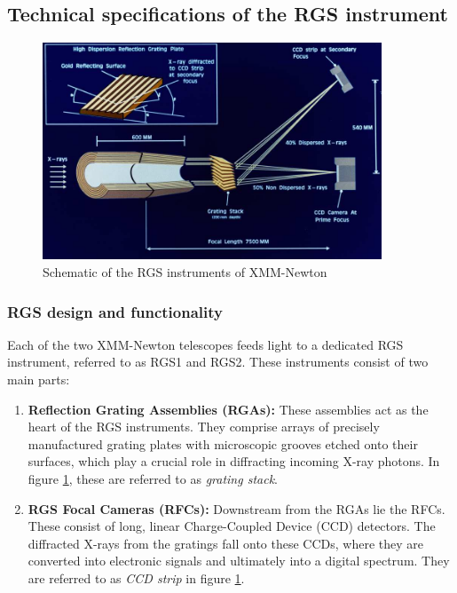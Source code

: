 		\subsection{Technical specifications of the RGS instrument}		
			\begin{figure}[h!]
				\centering
				\includegraphics[width=0.9\textwidth]{xmm-rgs.png}
				\caption{Schematic of the RGS instruments of XMM-Newton}
				\label{xmm-rgs-instrument}
			\end{figure}
			
			\subsubsection{RGS design and functionality}			
				Each of the two XMM-Newton telescopes feeds light to a dedicated RGS instrument, referred to as RGS1 and RGS2. These instruments consist of two main parts:
				\begin{enumerate}
					\item \textbf{Reflection Grating Assemblies (RGAs):} These assemblies act as the heart of the RGS instruments. They comprise arrays of precisely manufactured grating plates with microscopic grooves etched onto their surfaces, which play a crucial role in diffracting incoming X-ray photons. In figure \ref{xmm-rgs-instrument}, these are referred to as \emph{grating stack}.
					
					\item \textbf{RGS Focal Cameras (RFCs):} Downstream from the RGAs lie the RFCs. These consist of long, linear Charge-Coupled Device (CCD) detectors. The diffracted X-rays from the gratings fall onto these CCDs, where they are converted into electronic signals and ultimately into a digital spectrum. They are referred to as \emph{CCD strip} in figure \ref{xmm-rgs-instrument}.
				\end{enumerate}
			
